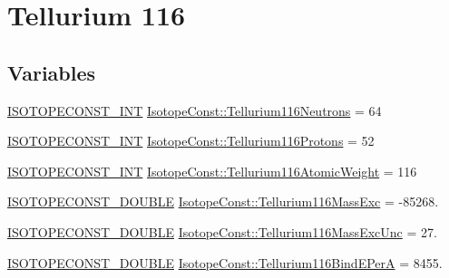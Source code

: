 \hypertarget{group___isotope_const-_tellurium-_te116}{}\section{Tellurium 116}
\label{group___isotope_const-_tellurium-_te116}
\subsection*{Variables}
\begin{DoxyCompactItemize}
\item 
\mbox{\hyperlink{group___isotope_const-_macros_ga5f18360b3e99483a35c32d789e62621c}{I\+S\+O\+T\+O\+P\+E\+C\+O\+N\+S\+T\+\_\+\+I\+NT}} \mbox{\hyperlink{group___isotope_const-_tellurium-_te116_ga51ccecc2f5f1ee21e468ae2bade18408}{Isotope\+Const\+::\+Tellurium116\+Neutrons}} = 64
\item 
\mbox{\hyperlink{group___isotope_const-_macros_ga5f18360b3e99483a35c32d789e62621c}{I\+S\+O\+T\+O\+P\+E\+C\+O\+N\+S\+T\+\_\+\+I\+NT}} \mbox{\hyperlink{group___isotope_const-_tellurium-_te116_gad69c7611b51d14b5c975473b6ed995d7}{Isotope\+Const\+::\+Tellurium116\+Protons}} = 52
\item 
\mbox{\hyperlink{group___isotope_const-_macros_ga5f18360b3e99483a35c32d789e62621c}{I\+S\+O\+T\+O\+P\+E\+C\+O\+N\+S\+T\+\_\+\+I\+NT}} \mbox{\hyperlink{group___isotope_const-_tellurium-_te116_ga267ecf87dae9347de737e77dc8c58c52}{Isotope\+Const\+::\+Tellurium116\+Atomic\+Weight}} = 116
\item 
\mbox{\hyperlink{group___isotope_const-_macros_ga8f45a7272ce02c0b4c65c44636ed719a}{I\+S\+O\+T\+O\+P\+E\+C\+O\+N\+S\+T\+\_\+\+D\+O\+U\+B\+LE}} \mbox{\hyperlink{group___isotope_const-_tellurium-_te116_ga1284ed787d589dfc4f09f54e37a7a4ff}{Isotope\+Const\+::\+Tellurium116\+Mass\+Exc}} = -\/85268.
\item 
\mbox{\hyperlink{group___isotope_const-_macros_ga8f45a7272ce02c0b4c65c44636ed719a}{I\+S\+O\+T\+O\+P\+E\+C\+O\+N\+S\+T\+\_\+\+D\+O\+U\+B\+LE}} \mbox{\hyperlink{group___isotope_const-_tellurium-_te116_gaf45245203890a6ff6c1caf778d35d384}{Isotope\+Const\+::\+Tellurium116\+Mass\+Exc\+Unc}} = 27.
\item 
\mbox{\hyperlink{group___isotope_const-_macros_ga8f45a7272ce02c0b4c65c44636ed719a}{I\+S\+O\+T\+O\+P\+E\+C\+O\+N\+S\+T\+\_\+\+D\+O\+U\+B\+LE}} \mbox{\hyperlink{group___isotope_const-_tellurium-_te116_gadfef519a577385ed749c9f489165b9a3}{Isotope\+Const\+::\+Tellurium116\+Bind\+E\+PerA}} = 8455.
\item 

\end{DoxyCompactItemize}
